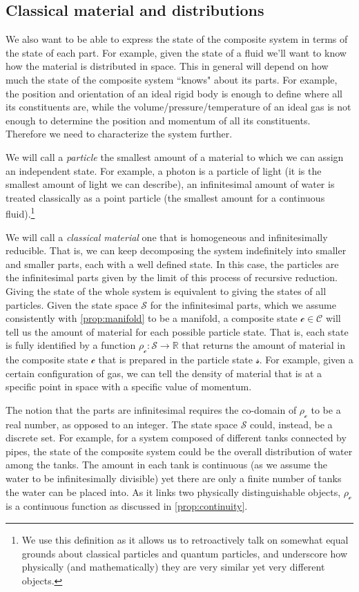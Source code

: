 \documentclass[smallextended]{svjour3}
\numberwithin{equation}{section}
\begin{document}
\subsection{Classical material and distributions}
We also want to be able to express the state of the composite system in terms of the state of each part. For example, given the state of a fluid we'll want to know how the material is distributed in space. This in general will depend on how much the state of the composite system ``knows" about its parts. For example, the position and orientation of an ideal rigid body is enough to define where all its constituents are, while the volume/pressure/temperature of an ideal gas is not enough to determine the position and momentum of all its constituents. Therefore we need to characterize the system further.

We will call a \emph{particle} the smallest amount of a material to which we can assign an independent state. For example, a photon is a particle of light (it is the smallest amount of light we can describe), an infinitesimal amount of water is treated classically as a point particle (the smallest amount for a continuous fluid).\footnote{We use this definition as it allows us to retroactively talk on somewhat equal grounds about classical particles and quantum particles, and underscore how physically (and mathematically) they are very similar yet very different objects.}

We will call a \emph{classical material} one that is homogeneous and infinitesimally reducible. That is, we can keep decomposing the system indefinitely into smaller and smaller parts, each with a well defined state. In this case, the particles are the infinitesimal parts given by the limit of this process of recursive reduction. Giving the state of the whole system is equivalent to giving the states of all particles. Given the state space $\mathcal{S}$ for the infinitesimal parts, which we assume consistently with \ref{prop:manifold} to be a manifold, a composite state $\mathcal{c} \in \mathcal{C}$ will tell us the amount of material for each possible particle state. That is, each state is fully identified by a function $\rho_\mathcal{c}: \mathcal{S} \to \mathbb{R}$ that returns the amount of material in the composite state $\mathcal{c}$ that is prepared in the particle state $\mathcal{s}$. For example, given a certain configuration of gas, we can tell the density of material that is at a specific point in space with a specific value of momentum.

The notion that the parts are infinitesimal requires the co-domain of $\rho_\mathcal{c}$ to be a real number, as opposed to an integer. The state space $\mathcal{S}$ could, instead, be a discrete set. For example, for a system composed of different tanks connected by pipes, the state of the composite system could be the overall distribution of water among the tanks. The amount in each tank is continuous (as we assume the water to be infinitesimally divisible) yet there are only a finite number of tanks the water can be placed into. As it links two physically distinguishable objects, $\rho_\mathcal{c}$ is a continuous function as discussed in \ref{prop:continuity}.
\end{document}
